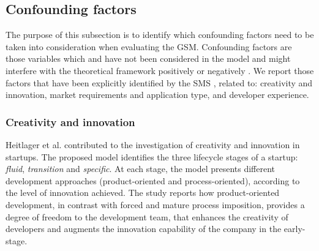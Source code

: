 \documentclass[10pt,journal,letterpaper,compsoc]{IEEEtran}
\begin{document}
\subsection{Confounding factors} \label{sect:an:comp:cat-vs-literature:conf}

The purpose of this subsection is to identify which confounding factors need to
be taken into consideration when evaluating the GSM. Confounding factors are
those variables which and have not been considered in the model and might
interfere with the theoretical framework positively or negatively
\cite{ColinRobson2009}. We report those factors that have been explicitly
identified by the SMS \cite{SMS} %
, related to: creativity and innovation, market requirements and application  
type, and developer experience.

\subsubsection{Creativity and innovation}
Heitlager et al. \cite{Heitlager2007} contributed to the investigation of
creativity and innovation in startups.  
The proposed model identifies the three lifecycle stages of a
startup:  \textit{fluid}, \textit{transition} and \textit{specific}. At each
stage, the  model presents different development approaches (product-oriented
and  process-oriented), according to the level of innovation achieved. The study
reports how product-oriented development, in contrast with forced and mature
process imposition, provides a degree of freedom to the development team, that
enhances the creativity of developers and augments the innovation capability of
the company in the early-stage.
\end{document}
